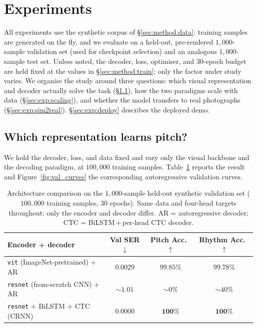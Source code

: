\section{Experiments}
\label{section:exp}

All experiments use the synthetic corpus of \S\ref{sec:method:data}: training
samples are generated on the fly, and we evaluate on a held-out, pre-rendered
$1{,}000$-sample validation set (used for checkpoint selection) and an analogous
$1{,}000$-sample test set. Unless noted, the decoder, loss, optimiser, and
$30$-epoch budget are held fixed at the values in \S\ref{sec:method:train}; only
the factor under study varies. We organise the study around three questions:
which visual representation and decoder actually solve the task
(\S\ref{sec:exp:arch}), how the two paradigms scale with data
(\S\ref{sec:exp:scaling}), and whether the model transfers to real photographs
(\S\ref{sec:exp:sim2real}). \S\ref{sec:exp:deploy} describes the deployed demo.

\subsection{Which representation learns pitch?}
\label{sec:exp:arch}

We hold the decoder, loss, and data fixed and vary only the visual backbone and
the decoding paradigm, at $100{,}000$ training samples. Table~\ref{table:arch}
reports the result and Figure~\ref{fig:val_curves} the corresponding
autoregressive validation curves.

\begin{table}[htbp]
\centering
\caption{Architecture comparison on the $1{,}000$-sample held-out synthetic
validation set ($100{,}000$ training samples, $30$ epochs). Same data and
four-head targets throughout; only the encoder and decoder differ. AR =
autoregressive decoder; CTC = BiLSTM\,+\,per-head CTC decoder.}
\label{table:arch}
\begin{tabular}{lccc}
\toprule
\textbf{Encoder + decoder} & \textbf{Val SER $\downarrow$} & \textbf{Pitch Acc.\ $\uparrow$} & \textbf{Rhythm Acc.\ $\uparrow$} \\
\midrule
\texttt{vit} (ImageNet-pretrained) + AR        & $0.0029$          & $99.85\%$          & $99.78\%$ \\
\texttt{resnet} (from-scratch CNN) + AR        & ${\sim}1.01$      & ${\sim}0\%$        & ${\sim}40\%$ \\
\texttt{resnet} + BiLSTM + CTC (CRNN)          & $\mathbf{0.0000}$ & $\mathbf{100\%}$   & $\mathbf{100\%}$ \\
\bottomrule
\end{tabular}
\end{table}

